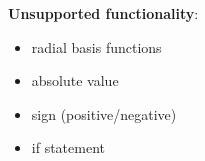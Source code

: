 \textbf{Unsupported functionality}:
\begin{itemize}[noitemsep]
\vspace{-1em}
\item radial basis functions
\item absolute value
\item sign (positive/negative)
\item if statement
\vspace{-1em}
\end{itemize}
